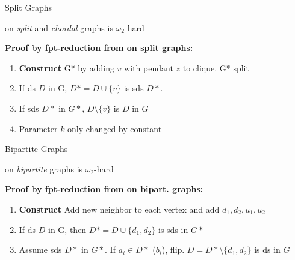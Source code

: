 \begin{frame}[c]{Split Graphs}

    \begin{tcolorbox}[colback=TUMBlueLighter]
        \sdom on \textit{split} and \textit{chordal} graphs is $\omega_2$-hard
    \end{tcolorbox}

    \begin{figure}[!ht]
    \end{figure}

    \textbf{Proof by  fpt-reduction from \pdom on split graphs:}

    \begin{enumerate}
        \item \textbf{Construct } G* by adding $v$ with pendant $z$ to clique. G* split
        \item If ds $D$ in G, $D* = D \cup \{v\}$ is sds $D*$.
        \item If sds $D*$ in $G*$, $D \setminus \{v\}$ is $D$ in $G$ 
        \item Parameter $k$ only changed by constant
    \end{enumerate}

\end{frame}

\begin{frame}[c]{Bipartite Graphs}

    \begin{tcolorbox}[colback=TUMBlueLighter]
        \sdom on \textit{bipartite} graphs is $\omega_2$-hard
    \end{tcolorbox}

    \begin{figure}[!ht]
    \end{figure}

    \textbf{Proof by fpt-reduction from \pdom on bipart. graphs:}

    \begin{enumerate}
        \item \textbf{Construct } Add new neighbor to each vertex and add $d_1,d_2,u_1,u_2$
        \item If ds $D$ in G, then $D* = D \cup \{d_1,d_2\}$ is sds in $G*$
        \item Assume sds $D*$ in $G*$. If $a_i \in D*$ ($b_i$), flip. $D = D* \setminus \{d_1,d_2\}$ is ds in $G$
    \end{enumerate}

    \end{frame}



